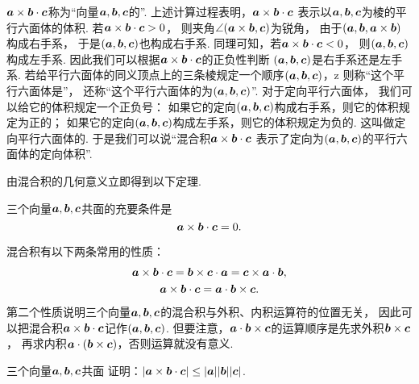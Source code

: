 \(\boldsymbol{a}\times\boldsymbol{b}\cdot\boldsymbol{c}\)称为“向量\(\boldsymbol{a},\boldsymbol{b},\boldsymbol{c}\)的”.
上述计算过程表明，\(\boldsymbol{a}\times\boldsymbol{b}\cdot\boldsymbol{c}\)
表示以\(\boldsymbol{a},\boldsymbol{b},\boldsymbol{c}\)为棱的平行六面体的体积.
若\(\boldsymbol{a}\times\boldsymbol{b}\cdot\boldsymbol{c}>0\)，
则夹角\(\angle(\boldsymbol{a}\times\boldsymbol{b},\boldsymbol{c})\)为锐角，
由于\((\boldsymbol{a},\boldsymbol{b},\boldsymbol{a}\times\boldsymbol{b})\)构成右手系，
于是\((\boldsymbol{a},\boldsymbol{b},\boldsymbol{c})\)也构成右手系.
同理可知，若\(\boldsymbol{a}\times\boldsymbol{b}\cdot\boldsymbol{c}<0\)，
则\((\boldsymbol{a},\boldsymbol{b},\boldsymbol{c})\)构成左手系.
因此我们可以根据\(\boldsymbol{a}\times\boldsymbol{b}\cdot\boldsymbol{c}\)的正负性判断
\((\boldsymbol{a},\boldsymbol{b},\boldsymbol{c})\)是右手系还是左手系.
若给平行六面体的同义顶点上的三条棱规定一个顺序\((\boldsymbol{a},\boldsymbol{b},\boldsymbol{c})\)，z
则称“这个平行六面体是”，
还称“这个平行六面体的为\((\boldsymbol{a},\boldsymbol{b},\boldsymbol{c})\)”.
对于定向平行六面体，
我们可以给它的体积规定一个正负号：
如果它的定向\((\boldsymbol{a},\boldsymbol{b},\boldsymbol{c})\)构成右手系，则它的体积规定为正的；
如果它的定向\((\boldsymbol{a},\boldsymbol{b},\boldsymbol{c})\)构成左手系，则它的体积规定为负的.
这叫做定向平行六面体的.
于是我们可以说“混合积\(\boldsymbol{a}\times\boldsymbol{b}\cdot\boldsymbol{c}\)
表示了定向为\((\boldsymbol{a},\boldsymbol{b},\boldsymbol{c})\)的平行六面体的定向体积”.

由混合积的几何意义立即得到以下定理.
\begin{theorem}
三个向量\(\boldsymbol{a},\boldsymbol{b},\boldsymbol{c}\)共面的充要条件是\[
	\boldsymbol{a}\times\boldsymbol{b}\cdot\boldsymbol{c} = 0.
\]
\end{theorem}

混合积有以下两条常用的性质：
\begin{gather}
	\boldsymbol{a}\times\boldsymbol{b}\cdot\boldsymbol{c}
	= \boldsymbol{b}\times\boldsymbol{c}\cdot\boldsymbol{a}
	= \boldsymbol{c}\times\boldsymbol{a}\cdot\boldsymbol{b}, \\
	\boldsymbol{a}\times\boldsymbol{b}\cdot\boldsymbol{c}
	= \boldsymbol{a}\cdot\boldsymbol{b}\times\boldsymbol{c}.
\end{gather}
第二个性质说明三个向量\(\boldsymbol{a},\boldsymbol{b},\boldsymbol{c}\)的混合积与外积、内积运算符的位置无关，
因此可以把混合积\(\boldsymbol{a}\times\boldsymbol{b}\cdot\boldsymbol{c}\)记作\((\boldsymbol{a},\boldsymbol{b},\boldsymbol{c})\).
但要注意，\(\boldsymbol{a}\cdot\boldsymbol{b}\times\boldsymbol{c}\)的运算顺序是先求外积\(\boldsymbol{b}\times\boldsymbol{c}\)，
再求内积\(\boldsymbol{a}\cdot(\boldsymbol{b}\times\boldsymbol{c})\)，否则运算就没有意义.

\begin{example}
三个向量\(\boldsymbol{a},\boldsymbol{b},\boldsymbol{c}\)共面
证明：\(\abs{\boldsymbol{a}\times\boldsymbol{b}\cdot\boldsymbol{c}}
\leq \abs{\boldsymbol{a}} \abs{\boldsymbol{b}} \abs{\boldsymbol{c}}\).
\end{example}

